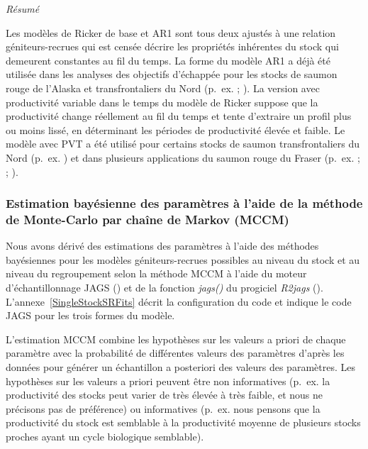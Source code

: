 \documentclass[french,11pt]{book}
\begin{document}
\emph{Résumé}

Les modèles de Ricker de base et AR1 sont tous deux ajustés à une relation géniteurs-recrues qui est censée décrire les propriétés inhérentes du stock qui demeurent constantes au fil du temps. La forme du modèle AR1 a déjà été utilisée dans les analyses des objectifs d'échappée pour les stocks de saumon rouge de l'Alaska et transfrontaliers du Nord (p.~ex. ; ). La version avec productivité variable dans le temps du modèle de Ricker suppose que la productivité change réellement au fil du temps et tente d'extraire un profil plus ou moins lissé, en déterminant les périodes de productivité élevée et faible. Le modèle avec PVT a été utilisé pour certains stocks de saumon transfrontaliers du Nord (p.~ex. ) et dans plusieurs applications du saumon rouge du Fraser (p.~ex. ; ; ).

\subsubsection{Estimation bayésienne des paramètres à l'aide de la méthode de Monte-Carlo par chaîne de Markov (MCCM)}\label{estimation-bayuxe9sienne-des-paramuxe8tres-uxe0-laide-de-la-muxe9thode-de-monte-carlo-par-chauxeene-de-markov-mccm}

Nous avons dérivé des estimations des paramètres à l'aide des méthodes bayésiennes pour les modèles géniteurs-recrues possibles au niveau du stock et au niveau du regroupement selon la méthode MCCM à l'aide du moteur d'échantillonnage JAGS () et de la fonction \emph{jags()} du progiciel \emph{R2jags} (). L'annexe~\ref{SingleStockSRFits} décrit la configuration du code et indique le code JAGS pour les trois formes du modèle.

L'estimation MCCM combine les hypothèses sur les valeurs a priori de chaque paramètre avec la probabilité de différentes valeurs des paramètres d'après les données pour générer un échantillon a posteriori des valeurs des paramètres. Les hypothèses sur les valeurs a priori peuvent être non informatives (p.~ex. la productivité des stocks peut varier de très élevée à très faible, et nous ne précisons pas de préférence) ou informatives (p.~ex. nous pensons que la productivité du stock est semblable à la productivité moyenne de plusieurs stocks proches ayant un cycle biologique semblable).
\end{document}

